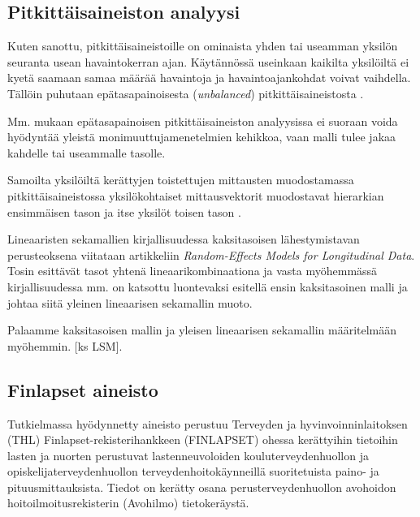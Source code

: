 \documentclass[finnish]{docopts}
\begin{document}
\subsection{Pitkittäisaineiston analyysi}
\label{sub:pitkittaisanal}

Kuten sanottu, pitkittäisaineistoille on ominaista yhden tai useamman yksilön seuranta usean havaintokerran ajan. Käytännössä useinkaan kaikilta yksilöiltä ei kyetä saamaan samaa määrää havaintoja ja havaintoajankohdat voivat vaihdella. Tällöin puhutaan epätasapainoisesta (\textit{unbalanced}) pitkittäisaineistosta \cite{laird82}.

Mm. \cite{verbeke00, goldstein11} mukaan epätasapainoisen pitkittäisaineiston analyysissa ei suoraan voida hyödyntää yleistä monimuuttujamenetelmien kehikkoa, vaan malli tulee jakaa kahdelle tai useammalle tasolle. 

Samoilta yksilöiltä kerättyjen toistettujen mittausten muodostamassa pitkittäisaineistossa yksilökohtaiset mittausvektorit muodostavat hierarkian ensimmäisen tason ja itse yksilöt toisen tason \cite{goldstein11}.


Lineaaristen sekamallien kirjallisuudessa kaksitasoisen lähestymistavan perusteoksena viitataan \cite{laird82} artikkeliin \textit{Random-Effects Models for Longitudinal Data}. Tosin \cite{laird82} esittävät tasot yhtenä lineaarikombinaationa ja vasta myöhemmässä kirjallisuudessa mm. \cite{verbeke00, talbott06} on katsottu luontevaksi esitellä ensin kaksitasoinen malli ja johtaa siitä \cite{laird82} yleinen lineaarisen sekamallin muoto.

Palaamme kaksitasoisen mallin ja yleisen lineaarisen sekamallin määritelmään myöhemmin. [ks LSM]. \\

\subsection{Finlapset aineisto}
\label{sub:finlapsetdata}

Tutkielmassa hyödynnetty aineisto perustuu Terveyden ja hyvinvoinninlaitoksen (THL) Finlapset-rekisterihankkeen (FINLAPSET) ohessa kerättyihin tietoihin lasten ja nuorten  perustuvat lastenneuvoloiden kouluterveydenhuollon ja opiskelijaterveydenhuollon terveydenhoitokäynneillä suoritetuista paino- ja pituusmittauksista. Tiedot on kerätty osana perusterveydenhuollon avohoidon hoitoilmoitusrekisterin (Avohilmo) tietokeräystä.\\
\end{document}
